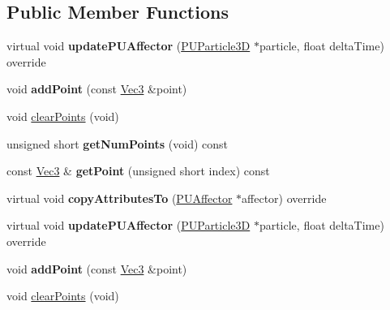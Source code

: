 \subsection*{Public Member Functions}
\begin{DoxyCompactItemize}
\item 
\mbox{\label{classPUPathFollower_a62535348a120c08b30f10761f50d7f6e}} 
virtual void {\bfseries update\+P\+U\+Affector} (\hyperlink{structPUParticle3D}{P\+U\+Particle3D} $\ast$particle, float delta\+Time) override
\item 
\mbox{\label{classPUPathFollower_a492f7d5e30f9741fd3fbe2ddf230f290}} 
void {\bfseries add\+Point} (const \hyperlink{classVec3}{Vec3} \&point)
\item 
void \hyperlink{classPUPathFollower_a44c13a6b8f8e2602361fae81842f4a1a}{clear\+Points} (void)
\item 
\mbox{\label{classPUPathFollower_aef513b47e8fd0a0a8307328281854148}} 
unsigned short {\bfseries get\+Num\+Points} (void) const
\item 
\mbox{\label{classPUPathFollower_a57ea225b5d4a1734309cfc60cea09fb7}} 
const \hyperlink{classVec3}{Vec3} \& {\bfseries get\+Point} (unsigned short index) const
\item 
\mbox{\label{classPUPathFollower_a1747155d31e5448ea1abf99ffae9b32d}} 
virtual void {\bfseries copy\+Attributes\+To} (\hyperlink{classPUAffector}{P\+U\+Affector} $\ast$affector) override
\item 
\mbox{\label{classPUPathFollower_a5cfe9769dae5306812f4a1fccb6c1734}} 
virtual void {\bfseries update\+P\+U\+Affector} (\hyperlink{structPUParticle3D}{P\+U\+Particle3D} $\ast$particle, float delta\+Time) override
\item 
\mbox{\label{classPUPathFollower_a492f7d5e30f9741fd3fbe2ddf230f290}} 
void {\bfseries add\+Point} (const \hyperlink{classVec3}{Vec3} \&point)
\item 
void \hyperlink{classPUPathFollower_a44c13a6b8f8e2602361fae81842f4a1a}{clear\+Points} (void)
\item 
\mbox{\label{classPUPathFollower_aef513b47e8fd0a0a8307328281854148}} 

\end{DoxyCompactItemize}
